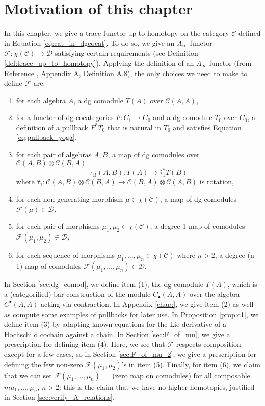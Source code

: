 \section{Motivation of this chapter}
In this chapter, we give a trace functor 
up to homotopy on the category $\mathcal{C}$ 
defined in Equation \ref{eq:cat_in_dgcocat}. 
To do so, we give an $A_\infty$-functor 
$\mathcal{F}: \chi(\mathcal{C}) \to 
\mathcal{D}$ satisfying 
certain requirements (see Definition 
\ref{def:trace_up_to_homotopy}). Applying 
the definition of an $A_\infty$-functor 
(from Reference \cite{F}, 
Appendix A, Definition A.8), the 
only choices we need to make to define 
$\mathcal{F}$ are:
\begin{enumerate}
	\item for each algebra $A$, 
	a dg comodule $T(A)$ over 
	$\mathcal{C}(A, A)$, 
	\item for a functor of dg cocategories 
	$F: C_1 \to C_0$ and a dg comodule $T_0$ over 
	$C_0$, a definition of a pullback 
	$F^*T_0$ that is natural in $T_0$ and satisfies 
	Equation \ref{eq:pullback_yoga},
	\item for each pair of algebras $A,B$, 
	a map of dg comodules over 
	$\mathcal{C}(A,B) \otimes \mathcal{C}(B,A)$
	$$\tau_{1!}(A,B):T(A) \to \hat{\tau}_1^* T(B)$$
	where $\hat{\tau}_1: \mathcal{C}(A,B) \otimes 
	\mathcal{C}(B,A) \to \mathcal{C}(B,A) \otimes 
	\mathcal{C}(A,B)$ is rotation,
	\item for each non-generating 
	morphism $\mu \in \chi(\mathcal{C})$, 
	a map of dg comodules $\mathcal{F}(\mu) \in 
	\mathcal{D}$,
	\item for each pair of morphisms $\mu_1, \mu_2 
	\in \chi(\mathcal{C})$, 
	a degree-1 map of comodules 
	$\mathcal{F}(\mu_1, \mu_2) \in 
	\mathcal{D}$, 
	\item for each sequence of morphisms 
	$\mu_1, \dots, \mu_n \in \chi(\mathcal{C})$ 
	where $n>2$, a degree-(n-1) map of comodules 
	$\mathcal{F}(\mu_1, \dots, \mu_n) \in 
	\mathcal{D}$.
\end{enumerate}
In Section \ref{sec:dg_comod}, we define item (1), the dg 
comodule $T(A)$, which is a (categorified) bar 
construction of the module $C_{\bullet}(A,A)$ over 
the algebra $C^\bullet(A,A)$ acting via contraction. 
In Appendix \ref{chap:}, we give item (2) as well as 
compute some examples of pullbacks for later use. 
In Proposition \ref{prop:c1}, we define item (3) by 
adapting known equations for the Lie derivative of a 
Hochschild cochain against a chain. 
In Section \ref{sec:F_of_mu}, we give a prescription for 
defining item (4). Here, we see that $\mathcal{F}$ 
respects composition except for a few cases, so 
in Section \ref{sec:F_of_mu_2}, we give a prescription for 
defining the few non-zero $\mathcal{F}(\mu_1, \mu_2)$'s 
in item (5). Finally, for item (6), we claim that we can set 
$\mathcal{F}(\mu_1, \dots, \mu_n) = $ (zero map 
on comodules) for all composable $mu_1, \dots, \mu_n$, 
$n>2$: this is the claim that we have no higher 
homotopies, justified in Section \ref{sec:verify_A_relations}.